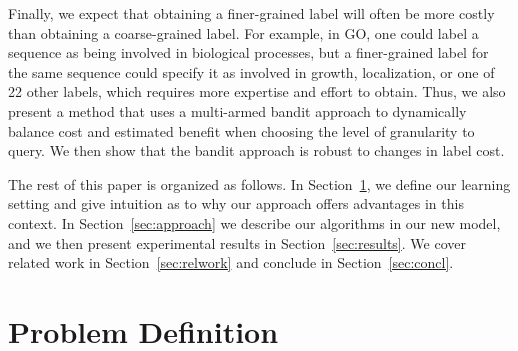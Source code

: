 \documentclass[10pt, conference, compsocconf]{IEEEtran}
\begin{document}
Finally, we expect that obtaining a finer-grained
label will often be more costly than obtaining
a coarse-grained label.  For example, in GO, one could
label a sequence as being involved in biological processes, but a finer-grained
label for the same sequence could specify it as involved in growth,
localization, or one of 22 other labels, which 
requires more expertise and effort
to obtain.  Thus, we also present a method that uses a multi-armed bandit
approach to dynamically balance
cost and estimated benefit when choosing the level of granularity to
query.  We then show that the bandit approach is robust to changes in
label cost.



The rest of this paper is organized as follows.  In Section~\ref{sec:defn},
we define our learning setting and give intuition as to why
our approach offers advantages in this context.  
In Section~\ref{sec:approach} we describe
our algorithms in our new model, and we then present 
experimental results in Section~\ref{sec:results}.
We cover related work in Section~\ref{sec:relwork} and conclude in Section~\ref{sec:concl}.

\section{Problem Definition}
\label{sec:defn}
\end{document}
